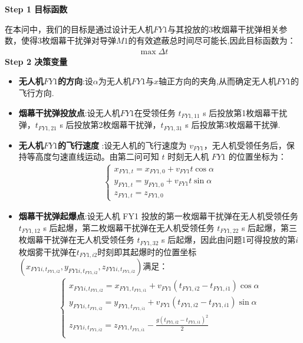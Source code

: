 \documentclass[../main.tex]{subfiles}
\begin{document}
\noindent \textbf{Step 1 目标函数}
\par 在本问中，我们的目标是通过设计无人机$FY1$与其投放的3枚烟幕干扰弹相关参数，使得3枚烟幕干扰弹对导弹$M1$的有效遮蔽总时间尽可能长,因此目标函数为：
\begin{align}\label{12.1}
  \max \Delta t
\end{align}
\noindent \textbf{Step 2 决策变量}

\begin{itemize}
\item \textbf{无人机$FY1$的方向}:设$\alpha $为无人机$FY1$与$x$轴正方向的夹角,从而确定无人机$FY1$的飞行方向.
\item \textbf{烟幕干扰弹投放点}:设无人机$FY1$在受领任务 \( t_{FY1,11} \) s 后投放第1枚烟幕干扰弹，\( t_{FY1,21} \) s 后投放第2枚烟幕干扰弹，\( t_{FY1,31} \) s 后投放第3枚烟幕干扰弹.
\item  \textbf{无人机$FY1$的飞行速度} :设无人机的飞行速度为 \( v_{FY1} \)，无人机受领任务后，保持等高度匀速直线运动。由第二问可知 \( t \) 时刻无人机 \( FY1 \) 的位置坐标为：
\begin{align}\label{12.3}
  \begin{cases}
x_{FY1,t} = x_{FY1,0} + v_{FY1} t \cos\alpha \\
y_{FY1,t} = y_{FY1,0} + v_{FY1} t \sin\alpha \\
z_{FY1,t} = z_{FY1,0}
\end{cases}
\end{align}
\item \textbf{烟幕干扰弹起爆点}:设无人机 FY1 投放的第一枚烟幕干扰弹在无人机受领任务 \( t_{FY1,12} \) s 后起爆，第二枚烟幕干扰弹在无人机受领任务 \( t_{FY1,22} \) s 后起爆，第三枚烟幕干扰弹在无人机受领任务 \( t_{FY1,32} \) s 后起爆，因此由问题1可得投放的第$i$枚烟雾干扰弹在$t_{FY1,i2}$时刻即其起爆时的位置坐标$\left( x_{FY1i,t_{FY1,i2}},y_{FY1i,t_{FY1,i2}},z_{FY1i,t_{FY1,i2}} \right)$满足：
\begin{align}\label{12.4}
\left\{ \begin{array}{l}
	x_{FY1i,t_{FY1,i2}}=x_{FY1,t_{FY1,i1}}+v_{FY1}\left( t_{FY1,i2}-t_{FY1,i1} \right) \cos \alpha\\
	y_{FY1i,t_{FY1,i2}}=y_{FY1,t_{FY1,i1}}+v_{FY1}\left( t_{FY1,i2}-t_{FY1,i1} \right) \sin \alpha\\
	z_{FY1i,t_{FY1,i2}}=z_{FY1,t_{FY1,i1}}-\frac{g\left( t_{FY1,i2}-t_{FY1,i1} \right) ^2}{2}\\
\end{array} \right. 
\end{align}

\end{itemize}
\end{document}
